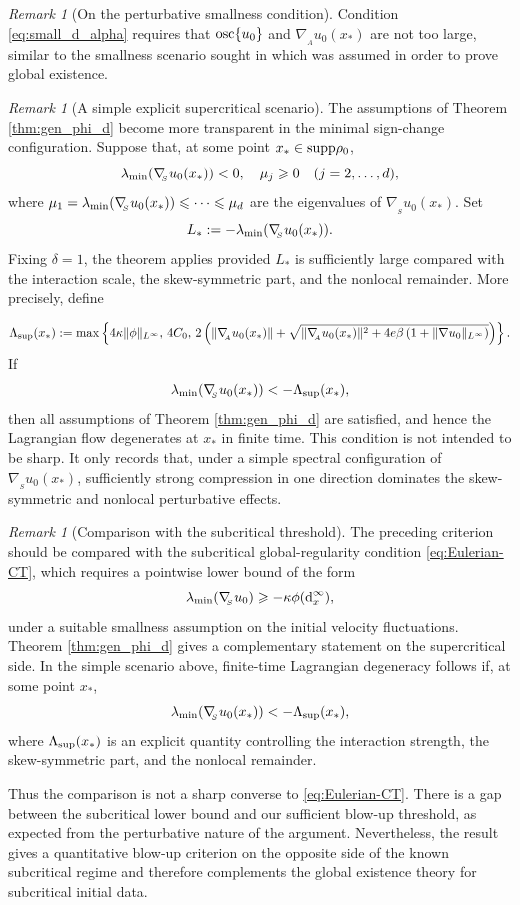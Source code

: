 \documentclass[11pt]{amsart}
\numberwithin{equation}{section}
\theoremstyle{definition}
\theoremstyle{remark}
\newtheorem{remark}[theorem]{Remark}
\numberwithin{equation}{section}
\newtheorem{remark}[theorem]{Remark}
\newcommand{\lt}{\left}
\newcommand{\rt}{\right}
\newcommand{\rd}{\textnormal{d}}
\newcommand{\supp}{{\rm supp}}
\newcommand{\nabS}{\nabla_{\!\!{}_S}}
\newcommand{\nabA}{\nabla_{\!\!{}_A}}
\newcommand{\lamin}{\lambda_{\textnormal{min}}}
\newcommand{\rdv}{\textnormal{osc}\{u_0\}}
\renewcommand{\ge}{\geqslant}
\renewcommand{\le}{\leqslant}
\begin{document}
 \begin{remark}[On the perturbative smallness condition] 
 Condition \eqref{eq:small_d_alpha} requires that $\rdv$ and $\nabA u_0(x_*)$
  are not too large, similar to the smallness scenario sought in \cite[eq. (27)]{Tad26}
  which was assumed in order to prove global existence. 
 \end{remark}
\begin{remark}[A simple explicit supercritical scenario]
The assumptions of Theorem \ref{thm:gen_phi_d} become more transparent in the minimal sign-change configuration. Suppose that, at some point $x_*\in\supp\rho_0$,
\[
\lamin(\nabS u_0(x_*))<0, \quad \mu_j\ge0\quad (j=2,\dots,d),
\]
where $\mu_1=\lamin(\nabS u_0(x_*))\le\cdots\le\mu_d$ are the eigenvalues of $\nabS u_0(x_*)$. Set
\[
L_*:=-\lamin(\nabS u_0(x_*)).
\]
Fixing $\delta=1$, the theorem applies provided $L_*$ is sufficiently large compared with the interaction scale, the skew-symmetric part, and the nonlocal remainder. More precisely, define

\[
\Lambda_{\rm sup}(x_*) := \max\lt\{ 4\kappa\|\phi\|_{L^\infty},\, 4C_0,\, 2\lt(\|\nabA u_0(x_*)\|+\sqrt{\|\nabA u_0(x_*)\|^2+4e\beta\lt(1+\|\nabla u_0\|_{L^\infty}\rt)}\rt) \rt\}.
\]
If
\[
\lamin(\nabS u_0(x_*))<-\Lambda_{\rm sup}(x_*),
\]
then all assumptions of Theorem \ref{thm:gen_phi_d} are satisfied, and hence the Lagrangian flow degenerates at $x_*$ in finite time. This condition is not intended to be sharp. It only records that, under a simple spectral configuration of $\nabS u_0(x_*)$, sufficiently strong compression in one direction dominates the skew-symmetric and nonlocal perturbative effects. 
\end{remark}

\begin{remark}[Comparison with the subcritical threshold]
The preceding criterion should be compared with the subcritical global-regularity condition \eqref{eq:Eulerian-CT}, which requires a pointwise lower bound of the form
\[
\lamin(\nabS u_0)\ge -\kappa\phi(\rd_x^\infty),
\]
under a suitable smallness assumption on the initial velocity fluctuations. Theorem \ref{thm:gen_phi_d} gives a complementary statement on the supercritical side. In the simple scenario above, finite-time Lagrangian degeneracy follows if, at some point $x_*$,
\[
\lamin(\nabS u_0(x_*))<-\Lambda_{\rm sup}(x_*),
\]
where $\Lambda_{\rm sup}(x_*)$ is an explicit quantity controlling the interaction strength, the skew-symmetric part, and the nonlocal remainder.

Thus the comparison is not a sharp converse to \eqref{eq:Eulerian-CT}. There is a gap between the subcritical lower bound and our sufficient blow-up threshold, as expected from the perturbative nature of the argument. Nevertheless, the result gives a quantitative blow-up criterion on the opposite side of the known subcritical regime and therefore complements the global existence theory for subcritical initial data.
\end{remark}
 
\end{document}
